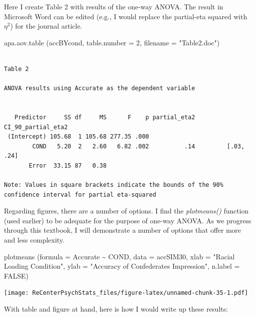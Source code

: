 \documentclass[
  english,
]{book}
\newenvironment{Shaded}{\begin{snugshade}}{\end{snugshade}}
\newcommand{\AttributeTok}[1]{\textcolor[rgb]{0.77,0.63,0.00}{#1}}
\newcommand{\ConstantTok}[1]{\textcolor[rgb]{0.00,0.00,0.00}{#1}}
\newcommand{\DecValTok}[1]{\textcolor[rgb]{0.00,0.00,0.81}{#1}}
\newcommand{\FunctionTok}[1]{\textcolor[rgb]{0.00,0.00,0.00}{#1}}
\newcommand{\NormalTok}[1]{#1}
\newcommand{\SpecialCharTok}[1]{\textcolor[rgb]{0.00,0.00,0.00}{#1}}
\newcommand{\StringTok}[1]{\textcolor[rgb]{0.31,0.60,0.02}{#1}}
\begin{document}
Here I create Table 2 with results of the one-way ANOVA. The result in Microsoft Word can be edited (e.g., I would replace the partial-eta squared with \(\eta^2\)) for the journal article.

\begin{Shaded}
\begin{Highlighting}[]
\FunctionTok{apa.aov.table}\NormalTok{ (accBYcond, }\AttributeTok{table.number =} \DecValTok{2}\NormalTok{, }\AttributeTok{filename =} \StringTok{"Table2.doc"}\NormalTok{)}
\end{Highlighting}
\end{Shaded}

\begin{verbatim}

Table 2 

ANOVA results using Accurate as the dependent variable
 

   Predictor     SS df     MS      F    p partial_eta2 CI_90_partial_eta2
 (Intercept) 105.68  1 105.68 277.35 .000                                
        COND   5.20  2   2.60   6.82 .002          .14         [.03, .24]
       Error  33.15 87   0.38                                            

Note: Values in square brackets indicate the bounds of the 90% confidence interval for partial eta-squared 
\end{verbatim}

Regarding figures, there are a number of options. I find the \emph{plotmeans()} function (used earlier) to be adequate for the purpose of one-way ANOVA. As we progress through this textbook, I will demonstrate a number of options that offer more and less complexity.

\begin{Shaded}
\begin{Highlighting}[]
\FunctionTok{plotmeans}\NormalTok{ (}\AttributeTok{formula =}\NormalTok{ Accurate }\SpecialCharTok{\textasciitilde{}}\NormalTok{ COND, }\AttributeTok{data =}\NormalTok{ accSIM30, }\AttributeTok{xlab =} \StringTok{"Racial Loading Condition"}\NormalTok{, }\AttributeTok{ylab =} \StringTok{"Accuracy of Confederate\textquotesingle{}s Impression"}\NormalTok{, }\AttributeTok{n.label =} \ConstantTok{FALSE}\NormalTok{)}
\end{Highlighting}
\end{Shaded}

\texttt{[image: ReCenterPsychStats\_files/figure-latex/unnamed-chunk-35-1.pdf]}

With table and figure at hand, here is how I would write up these results:
\end{document}
